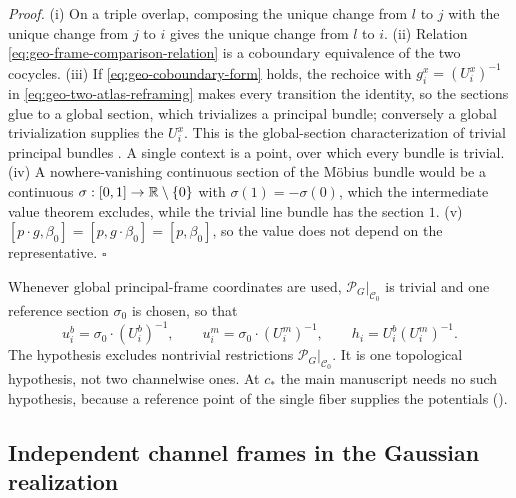 \noindent\emph{Proof.}
(i) On a triple overlap, composing the unique change from \(l\) to \(j\) with the unique change from
\(j\) to \(i\) gives the unique change from \(l\) to \(i\). (ii) Relation
\eqref{eq:geo-frame-comparison-relation} is a coboundary equivalence of the two cocycles. (iii) If
\eqref{eq:geo-coboundary-form} holds, the rechoice with \(g_i^x=(U_i^x)^{-1}\) in
\eqref{eq:geo-two-atlas-reframing} makes every transition the identity, so the sections glue to a
global section, which trivializes a principal bundle; conversely a global trivialization supplies the
\(U_i^x\). This is the global-section characterization of trivial principal bundles
\citep{Steenrod1951,Husemoller1994,Kobayashi1963}. A single context is a point, over which every
bundle is trivial. (iv) A nowhere-vanishing continuous section of the M\"obius bundle would be a
continuous \(\sigma:[0,1]\to\mathbb R\setminus\{0\}\) with \(\sigma(1)=-\sigma(0)\), which the
intermediate value theorem excludes, while the trivial line bundle has the section \(1\). (v)
\([p\cdot g,\beta_0]=[p,g\cdot\beta_0]=[p,\beta_0]\), so the value does not depend on the
representative. \hfill$\square$

Whenever global principal-frame coordinates are used, \(\mathscr P_G|_{\mathcal C_0}\) is trivial
and one reference section \(\sigma_0\) is chosen, so that
\begin{equation}
u_i^b=\sigma_0\cdot(U_i^b)^{-1},
\qquad
u_i^m=\sigma_0\cdot(U_i^m)^{-1},
\qquad
h_i=U_i^b(U_i^m)^{-1}.
\label{eq:geo-frame-field}
\end{equation}
The hypothesis excludes nontrivial restrictions \(\mathscr P_G|_{\mathcal C_0}\). It is one
topological hypothesis, not two channelwise ones. At \(c_*\) the main manuscript needs no such
hypothesis, because a reference point of the single fiber supplies the potentials
().

\subsection{Independent channel frames in the Gaussian realization}
\label{sec:gen-gaussian-covariance}


